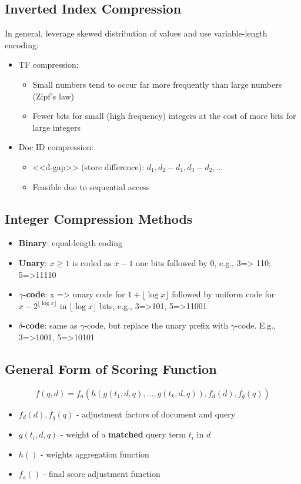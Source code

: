 \subsection{Inverted Index Compression}

In general, leverage skewed distribution of values and use variable-length encoding:
\begin{itemize}
\item TF compression:
\begin{itemize}
\item Small numbers tend to occur far more frequently than large
numbers (Zipf's law)
\item Fewer bits for small (high frequency) integers at the cost of more bits for large integers
\end{itemize}

\item Doc ID compression:
\begin{itemize}
\item <<d-gap>> (store difference): $d_1, d_2-d_1, d_3-d_2, \dots$
\item Feasible due to sequential access
\end{itemize}
\end{itemize}

\subsection{Integer Compression Methods}
\begin{itemize}
\item \textbf{Binary}: equal-length coding
\item \textbf{Unary}: $x \geqslant 1$ is coded as $x-1$ one bits followed by 0, e.g.,
3=> 110; 5=>11110
\item \textbf{$\gamma$-code}: x => unary code for $1+\lfloor \log x \rfloor$ followed by uniform code for $x-2^{\lfloor \log x \rfloor}$ in $\lfloor \log x \rfloor$ bits, e.g., 3=>101, 5=>11001
\item \textbf{$\delta$-code}: same as $\gamma$-code, but replace the unary prefix with $\gamma$-code. E.g., 3=>1001, 5=>10101
\end{itemize}

\subsection{General Form of Scoring Function}
\begin{equation*}
f(q,d) = f_a\left( h\left( g(t_1, d, q), \dots, g(t_k, d, q)\right), f_d(d), f_q(q)\right)
\end{equation*}
\begin{itemize}
\item $f_d(d), f_q(q)$ - adjustment factors of document and query
\item $g(t_i, d, q)$ - weight of a \textbf{matched} query term $t_i$ in $d$
\item $h()$ - weights aggregation function 
\item $f_a()$ - final score adjustment function
\end{itemize}


